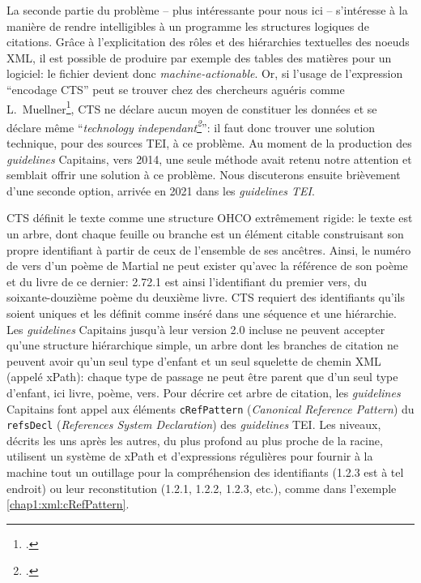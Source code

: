La seconde partie du problème -- plus intéressante pour nous ici -- s'intéresse à la manière de rendre intelligibles à un programme les structures logiques de citations. Grâce à l'explicitation des rôles et des hiérarchies textuelles des noeuds XML, il est possible de produire par exemple des tables des matières pour un logiciel: le fichier devient donc \textit{machine-actionable}. Or, si l'usage de l'expression \enquote{encodage CTS} peut se trouver chez des chercheurs aguéris comme  L.~Muellner\footcite{muellner2019free}, CTS ne déclare aucun moyen de constituer les données et se déclare même \enquote{\textit{technology independant\footcite{smith_brief_nodate}}}: il faut donc trouver une solution technique, pour des sources TEI, à ce problème. Au moment de la production des \textit{guidelines} Capitains, vers 2014, une seule méthode avait retenu notre attention et semblait offrir une solution à ce problème. Nous discuterons ensuite brièvement d'une seconde option, arrivée en 2021 dans les \textit{guidelines TEI}.

CTS définit le texte comme une structure OHCO extrêmement rigide: le texte est un arbre, dont chaque feuille ou branche est un élément citable construisant son propre identifiant à partir de ceux de l'ensemble de ses ancêtres. Ainsi, le numéro de vers d'un poème de Martial ne peut exister qu'avec la référence de son poème et du livre de ce dernier: 2.72.1 est ainsi l'identifiant du premier vers, du soixante-douzième poème du deuxième livre. CTS requiert des identifiants qu'ils soient uniques et les définit comme inséré dans une séquence et une hiérarchie. Les \textit{guidelines} Capitains jusqu'à leur version 2.0 incluse ne peuvent accepter qu'une structure hiérarchique simple, un arbre dont les branches de citation ne peuvent avoir qu'un seul type d'enfant et un seul squelette de chemin XML (appelé xPath): chaque type de passage ne peut être parent que d'un seul type d'enfant, ici livre, poème, vers. Pour décrire cet arbre de citation, les \textit{guidelines} Capitains font appel aux éléments \texttt{cRefPattern} (\textit{Canonical Reference Pattern}) du \texttt{refsDecl} (\textit{References System Declaration}) des \textit{guidelines} TEI. Les niveaux, décrits les uns après les autres, du plus profond au plus proche de la racine, utilisent un système de xPath et d'expressions régulières pour fournir à la machine tout un outillage pour la compréhension des identifiants (1.2.3 est à tel endroit) ou leur reconstitution (1.2.1, 1.2.2, 1.2.3, etc.), comme dans l'exemple \ref{chap1:xml:cRefPattern}.

